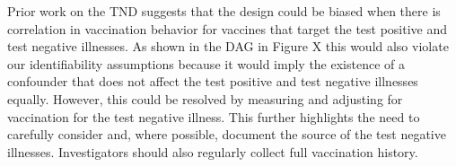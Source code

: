 \documentclass[11pt]{article}
\begin{document}
Prior work on the TND suggests that the design could be biased when there is correlation in vaccination behavior for vaccines that target the test positive and test negative illnesses. As shown in the DAG in Figure X this would also violate our identifiability assumptions because it would imply the existence of a confounder that does not affect the test positive and test negative illnesses equally. However, this could be resolved by measuring and adjusting for vaccination for the test negative illness. This further highlights the need to carefully consider and, where possible, document the source of the test negative illnesses. Investigators should also regularly collect full vaccination history.

\newpage

\printbibliography
\end{document}
